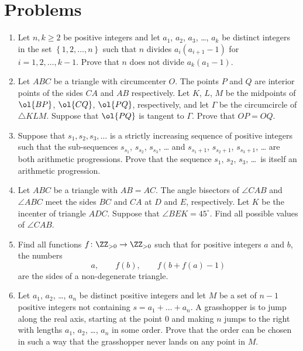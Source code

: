 \documentclass[11pt]{scrartcl}
\begin{document}
\section{Problems}
\begin{enumerate}[\bfseries 1.]
\item %
Let $n, k \ge 2$ be positive integers and let $a_1$, $a_2$, $a_3$, \dots, $a_k$
be distinct integers in the set $\left\{ 1,2,\dots,n \right\}$
such that $n$ divides $a_i(a_{i+1} - 1)$ for $i = 1,2,\dots,k-1$.
Prove that $n$ does not divide $a_k(a_1 - 1)$.

\item %
Let $ABC$ be a triangle with circumcenter $O$.
The points $P$ and $Q$ are interior points of the sides $CA$ and $AB$ respectively.
Let $K$, $L$, $M$ be the midpoints of $\ol{BP}$, $\ol{CQ}$, $\ol{PQ}$,
respectively, and let $\Gamma$ be the circumcircle of $\triangle KLM$.
Suppose that $\ol{PQ}$ is tangent to $\Gamma$. Prove that $OP = OQ$.

\item %
Suppose that $s_1,s_2,s_3, \dotsc$ is a strictly increasing sequence of
positive integers such that the sub-sequences
$s_{s_1}$, $s_{s_2}$, $s_{s_3}$, \dots
and $s_{s_1 + 1}$, $s_{s_2 + 1}$, $s_{s_3 + 1}$, \dots
are both arithmetic progressions.
Prove that the sequence $s_1$, $s_2$, $s_3$, \dots\ is itself an arithmetic progression.

\item %
Let $ABC$ be a triangle with $AB = AC$.
The angle bisectors of $\angle CAB$ and $\angle ABC$
meet the sides $BC$ and $CA$ at $D$ and $E$, respectively.
Let $K$ be the incenter of triangle $ADC$.
Suppose that $\angle BEK = 45^\circ$.
Find all possible values of $\angle CAB$.

\item %
Find all functions $f \colon \ZZ_{>0} \to \ZZ_{>0}$
such that for positive integers $a$ and $b$, the numbers
\[ a, \qquad f(b), \qquad f(b+f(a)-1) \]
are the sides of a non-degenerate triangle.

\item %
Let $a_1$, $a_2$, \dots, $a_n$ be distinct positive integers and
let $M$ be a set of $n-1$ positive integers not containing $s = a_1 + \dots + a_n$.
A grasshopper is to jump along the real axis, starting at the point $0$ and
making $n$ jumps to the right with lengths $a_1$, $a_2$, \dots, $a_n$ in some order.
Prove that the order can be chosen in such a way that
the grasshopper never lands on any point in $M$.

\end{enumerate}
\pagebreak
\end{document}
